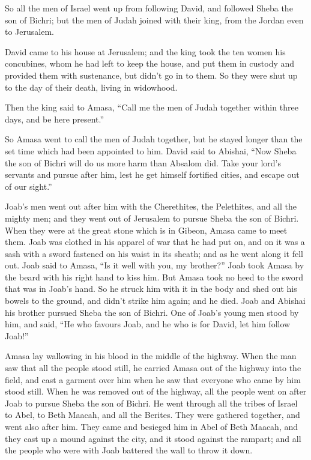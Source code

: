  So all the men of Israel went up from following David,
and followed Sheba the son of Bichri; but the men of Judah joined with
their king, from the Jordan even to Jerusalem.

 David came to his house at Jerusalem; and the king took
the ten women his concubines, whom he had left to keep the house, and
put them in custody and provided them with sustenance, but didn't go in
to them. So they were shut up to the day of their death, living in
widowhood.

 Then the king said to Amasa, ``Call me the men of Judah
together within three days, and be here present.''

 So Amasa went to call the men of Judah together, but he
stayed longer than the set time which had been appointed to him.
 David said to Abishai, ``Now Sheba the son of Bichri will
do us more harm than Absalom did. Take your lord's servants and pursue
after him, lest he get himself fortified cities, and escape out of our
sight.''

 Joab's men went out after him with the Cherethites, the
Pelethites, and all the mighty men; and they went out of Jerusalem to
pursue Sheba the son of Bichri.  When they were at the
great stone which is in Gibeon, Amasa came to meet them. Joab was
clothed in his apparel of war that he had put on, and on it was a sash
with a sword fastened on his waist in its sheath; and as he went along
it fell out.  Joab said to Amasa, ``Is it well with you,
my brother?'' Joab took Amasa by the beard with his right hand to kiss
him.  But Amasa took no heed to the sword that was in
Joab's hand. So he struck him with it in the body and shed out his
bowels to the ground, and didn't strike him again; and he died. Joab and
Abishai his brother pursued Sheba the son of Bichri.  One
of Joab's young men stood by him, and said, ``He who favours Joab, and
he who is for David, let him follow Joab!''

 Amasa lay wallowing in his blood in the middle of the
highway. When the man saw that all the people stood still, he carried
Amasa out of the highway into the field, and cast a garment over him
when he saw that everyone who came by him stood still. 
When he was removed out of the highway, all the people went on after
Joab to pursue Sheba the son of Bichri.  He went through
all the tribes of Israel to Abel, to Beth Maacah, and all the Berites.
They were gathered together, and went also after him. 
They came and besieged him in Abel of Beth Maacah, and they cast up a
mound against the city, and it stood against the rampart; and all the
people who were with Joab battered the wall to throw it down.

